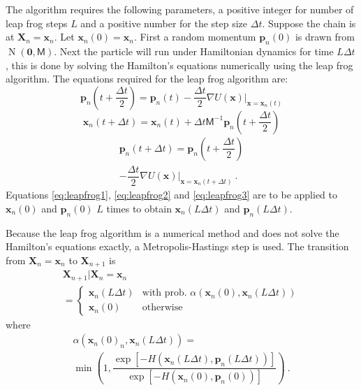 \documentclass[10pt]{proc}
\DeclareMathOperator{\normal}{N}
\newcommand{\vect}[1]{\mathbf{#1}}
\newcommand{\matr}[1]{\mathsf{#1}}
\begin{document}
The algorithm requires the following parameters, a positive integer for number of leap frog steps $L$ and a positive number for the step size $\Delta t$. Suppose the chain is at $\vect{X}_n=\vect{x}_n$. Let $\vect{x}_n(0) = \vect{x}_n$. First a random momentum $\vect{p}_n(0)$ is drawn from $\normal\left(\vect{0},\matr{M}\right)$. Next the particle will run under Hamiltonian dynamics for time $L\Delta t$, this is done by solving the Hamilton's equations numerically using the leap frog algorithm. The equations required for the leap frog algorithm are:
\begin{equation}
\vect{p}_n\left(t+\dfrac{\Delta t}{2}\right) = \vect{p}_n(t) - \dfrac{\Delta t}{2}\nabla \left.U(\vect{x})\right|_{\vect{x} = \vect{x}_n(t)}
\label{eq:leapfrog1}
\end{equation}
\begin{equation}
\vect{x}_n(t+\Delta t) = \vect{x}_n(t)+\Delta t \matr{M}^{-1}\vect{p}_n\left(t+\dfrac{\Delta t}{2}\right)
\label{eq:leapfrog2}
\end{equation}
\begin{multline}
\vect{p}_n(t+\Delta t) =
\vect{p}_n\left(t+\dfrac{\Delta t}{2}\right)
\\
- \dfrac{\Delta t}{2}\nabla \left.U(\vect{x})\right|_{\vect{x} = \vect{x}_n(t+\Delta t)}
\ .
\label{eq:leapfrog3}
\end{multline}
Equations \eqref{eq:leapfrog1}, \eqref{eq:leapfrog2} and \eqref{eq:leapfrog3} are to be applied to $\vect{x}_n(0)$ and $\vect{p}_n(0)$ $L$ times to obtain $\vect{x}_n(L\Delta t)$ and $\vect{p}_n(L\Delta t)$.

Because the leap frog algorithm is a numerical method and does not solve the Hamilton's equations exactly, a Metropolis-Hastings step is used. The transition from $\vect{X}_n = \vect{x}_n$ to $\vect{X}_{n+1}$ is
\begin{multline}
\vect{X}_{n+1}|\vect{X}_{n}=\vect{x}_n
\\= 
	\begin{cases}
	\vect{x}_{n}(L\Delta t) & \text{with prob. } \alpha\left(\vect{x}_{n}(0),\vect{x}_{n}(L\Delta t)\right) \\
	\vect{x}_n(0) & \text{otherwise}
	\end{cases}
\end{multline}
where
\begin{multline}
\alpha\left(\vect{x}_{n}(0)_n,\vect{x}_{n}(L\Delta t)\right)=
\\
\min\left(
1,
\dfrac{
  \exp\left[
    -H(
      \vect{x}_n(L\Delta t),\vect{p}_n(L\Delta t)
    )
  \right]
}
{
  \exp\left[
    -H(
      \vect{x}_n(0),\vect{p}_n(0)
    )
  \right]
}
\right) \ .
\end{multline}
\end{document}
